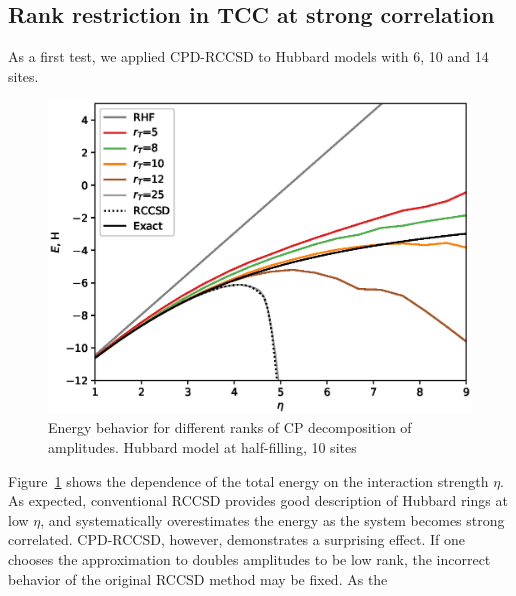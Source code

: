 \subsection{Rank restriction in TCC at strong correlation}
As a first test, we applied CPD-RCCSD to Hubbard models with 6, 10 and 14 
sites. 
%
\begin{figure}[ht!]
\centering
\includegraphics[width=\columnwidth]
{figures/tcc_strong_correlation/energy_vs_u_10_sites_cpd_rccsd}
\caption{Energy behavior for different ranks of CP decomposition of amplitudes. 
Hubbard model at half-filling, 10 sites}
\label{fig:energy_vs_u_cpd}
\end{figure}
%
Figure~\ref{fig:energy_vs_u_cpd} shows the dependence of the total energy 
on the interaction strength $\eta$. As expected, conventional RCCSD provides 
good description of Hubbard rings at low $\eta$, and systematically 
overestimates the energy as the system becomes strong correlated. CPD-RCCSD, 
however, demonstrates a surprising effect. If one chooses the approximation to 
doubles amplitudes to be low 
rank, the incorrect behavior of the original RCCSD method may be fixed. As the 

